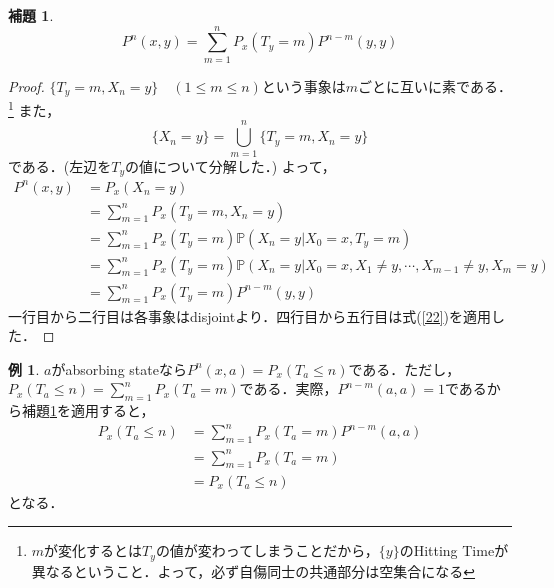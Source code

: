 \documentclass[12pt, a4paper]{jsarticle}
\theoremstyle{definition}
\newtheorem{lem}[thm]{補題}
\newtheorem{ex}{例}[section]
\begin{document}
\begin{screen}
	\begin{lem} \label{lem1-2}
	\[P^n (x,y) = \sum_{m = 1}^{n} P_x(T_y = m)P^{n-m}(y,y)\]
	\end{lem}
\end{screen}
\begin{proof}
$\{T_y = m, X_n =y\} \quad (1 \leq m \leq n)$という事象は$m$ごとに互いに素である．\footnote{$m$が変化するとは$T_y$の値が変わってしまうことだから，$\{y\}$のHitting Timeが異なるということ．よって，必ず自傷同士の共通部分は空集合になる}
また，
\[ \{X_n = y\} = \bigcup_{m=1}^{n} \{ T_y = m , X_n = y \} \]
である．(左辺を$T_y$の値について分解した．)
よって，
\begin{align*}
P^n(x,y) &= P_x(X_n = y) \\
&= \sum_{m = 1}^{n} P_x(T_y =m, X_n = y) 　\\
&= \sum_{m= 1}^{n} P_x(T_y = m) \mathbb{P}(X_n = y | X_0 = x, T_y = m) \\
&= \sum_{m= 1}^{n} P_x(T_y = m) \mathbb{P}(X_n = y | X_0 = x, X_1 \neq y, \cdots ,X_{m-1} \neq y, X_m =y) \\
&= \sum_{m= 1}^{n} P_x(T_y = m)P^{n-m}(y,y) 
\end{align*}
一行目から二行目は各事象はdisjointより．四行目から五行目は式(\ref{22})を適用した．
\end{proof}

\begin{ex}
$a$がabsorbing stateなら$P^n(x,a) = P_x(T_a \leq n)$である．ただし，$P_x(T_a \leq n) = \displaystyle \sum_{m = 1}^n P_x(T_a = m)$である．実際，$P^{n-m}(a,a) = 1$であるから補題\ref{lem1-2}を適用すると，
\begin{align*}
P_x(T_a \leq n) &= \sum_{m = 1}^n P_x(T_a = m)P^{n-m}(a,a) \\
&= \sum_{m = 1}^n P_x(T_a = m) \\
&= P_x(T_a \leq n)
\end{align*}
となる．
\end{ex}
\end{document}
